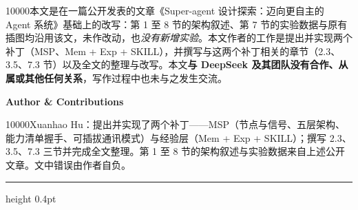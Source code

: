 \documentclass[11pt,a4paper,UTF8,fontset=windows]{ctexart}
\begin{document}
\vspace{1.0em}
\begin{center}
\begin{minipage}{0.94\linewidth}
\small
\par{}\vspace{0.45em}\penalty10000本文是在一篇公开发表的文章《Super-agent 设计探索：迈向更自主的 Agent 系统》基础上的改写：第 1 至 8 节的架构叙述、第 7 节的实验数据与原有插图均沿用该文，未作改动，也\emph{没有新增实验}。本文作者的工作是提出并实现两个补丁（MSP、Mem + Exp + SKILL），并撰写与这两个补丁相关的章节（2.3、3.5、7.3 节）以及全文的整理与改写。本文\textbf{与 DeepSeek 及其团队没有合作、从属或其他任何关系}，写作过程中也未与之发生交流。\par{}\vspace{0.55em}\textbf{Author \& Contributions}\par{}\vspace{0.45em}\penalty10000Xuanhao Hu：提出并实现了两个补丁——MSP（节点与信号、五层架构、能力清单握手、可插拔通讯模式）与经验层（Mem + Exp + SKILL）；撰写 2.3、3.5、7.3 三节并完成全文整理。第 1 至 8 节的架构叙述与实验数据来自上述公开文章。文中错误由作者自负。
\par
\end{minipage}
\end{center}

\vspace{0.6em}
{\color{dagray}\hrule height 0.4pt}
\vspace{0.35em}
\end{document}
